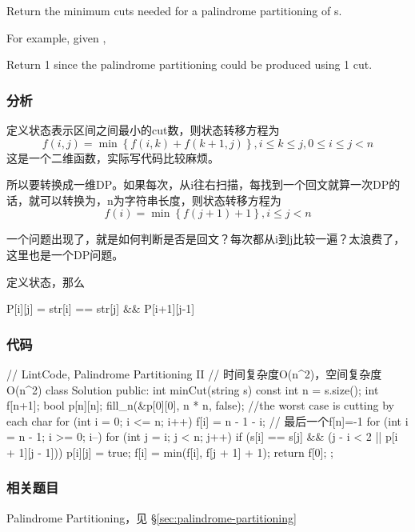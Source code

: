 Return the minimum cuts needed for a palindrome partitioning of s.

For example, given ,

Return 1 since the palindrome partitioning \code{["aa","b"]} could be produced using 1 cut.


\subsubsection{分析}
定义状态表示区间\fn{[i,j]}之间最小的cut数，则状态转移方程为 
$$
f(i,j)=\min\left\{f(i,k)+f(k+1,j)\right\}, i \leq k \leq j, 0 \leq i \leq j<n
$$
这是一个二维函数，实际写代码比较麻烦。
 
所以要转换成一维DP。如果每次，从i往右扫描，每找到一个回文就算一次DP的话，就可以转换为，n为字符串长度，则状态转移方程为
$$
f(i)=\min\left\{f(j+1)+1\right\}, i \leq j<n
$$

一个问题出现了，就是如何判断\fn{[i,j]}是否是回文？每次都从i到j比较一遍？太浪费了，这里也是一个DP问题。

定义状态，那么
\begin{Code}
P[i][j] = str[i] == str[j] && P[i+1][j-1]
\end{Code}


\subsubsection{代码}
\begin{Code}
// LintCode, Palindrome Partitioning II
// 时间复杂度O(n^2)，空间复杂度O(n^2)
class Solution {
public:
    int minCut(string s) {
        const int n = s.size();
        int f[n+1];
        bool p[n][n];
        fill_n(&p[0][0], n * n, false);
        //the worst case is cutting by each char
        for (int i = 0; i <= n; i++)
            f[i] = n - 1 - i; // 最后一个f[n]=-1
        for (int i = n - 1; i >= 0; i--) {
            for (int j = i; j < n; j++) {
                if (s[i] == s[j] && (j - i < 2 || p[i + 1][j - 1])) {
                    p[i][j] = true;
                    f[i] = min(f[i], f[j + 1] + 1);
                }
            }
        }
        return f[0];
    }
};
\end{Code}


\subsubsection{相关题目}
\begindot
\item Palindrome Partitioning，见 \S \ref{sec:palindrome-partitioning}
\myenddot


